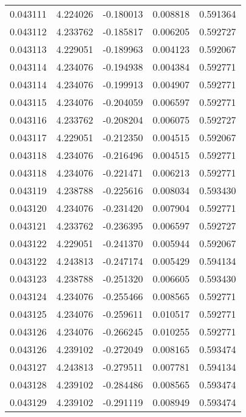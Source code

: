 \begin{tabular}{lrrrr}
0.043111    &  4.224026 & -0.180013 &  0.008818 &             0.591364 \\
0.043112    &  4.233762 & -0.185817 &  0.006205 &             0.592727 \\
0.043113    &  4.229051 & -0.189963 &  0.004123 &             0.592067 \\
0.043114    &  4.234076 & -0.194938 &  0.004384 &             0.592771 \\
0.043114    &  4.234076 & -0.199913 &  0.004907 &             0.592771 \\
0.043115    &  4.234076 & -0.204059 &  0.006597 &             0.592771 \\
0.043116    &  4.233762 & -0.208204 &  0.006075 &             0.592727 \\
0.043117    &  4.229051 & -0.212350 &  0.004515 &             0.592067 \\
0.043118    &  4.234076 & -0.216496 &  0.004515 &             0.592771 \\
0.043118    &  4.234076 & -0.221471 &  0.006213 &             0.592771 \\
0.043119    &  4.238788 & -0.225616 &  0.008034 &             0.593430 \\
0.043120    &  4.234076 & -0.231420 &  0.007904 &             0.592771 \\
0.043121    &  4.233762 & -0.236395 &  0.006597 &             0.592727 \\
0.043122    &  4.229051 & -0.241370 &  0.005944 &             0.592067 \\
0.043122    &  4.243813 & -0.247174 &  0.005429 &             0.594134 \\
0.043123    &  4.238788 & -0.251320 &  0.006605 &             0.593430 \\
0.043124    &  4.234076 & -0.255466 &  0.008565 &             0.592771 \\
0.043125    &  4.234076 & -0.259611 &  0.010517 &             0.592771 \\
0.043126    &  4.234076 & -0.266245 &  0.010255 &             0.592771 \\
0.043126    &  4.239102 & -0.272049 &  0.008165 &             0.593474 \\
0.043127    &  4.243813 & -0.279511 &  0.007781 &             0.594134 \\
0.043128    &  4.239102 & -0.284486 &  0.008565 &             0.593474 \\
0.043129    &  4.239102 & -0.291119 &  0.008949 &             0.593474 \\

\end{tabular}
